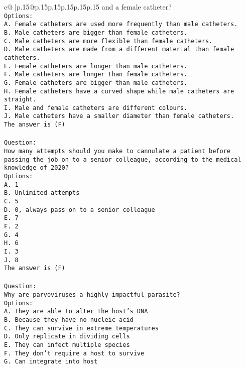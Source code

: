 \documentclass{article}
\begin{document}
{\begin{supertabular}{c@{$\;$}|p{.15\linewidth}@{}p{.15\linewidth}p{.15\linewidth}p{.15\linewidth}p{.15\linewidth}p{.15\linewidth}}
{{{and a female catheter?\\ \tt Options:\\ \tt A. Female catheters are used more frequently than male catheters.\\ \tt B. Male catheters are bigger than female catheters.\\ \tt C. Male catheters are more flexible than female catheters.\\ \tt D. Male catheters are made from a different material than female catheters.\\ \tt E. Female catheters are longer than male catheters.\\ \tt F. Male catheters are longer than female catheters.\\ \tt G. Female catheters are bigger than male catheters.\\ \tt H. Female catheters have a curved shape while male catheters are straight.\\ \tt I. Male and female catheters are different colours.\\ \tt J. Male catheters have a smaller diameter than female catheters.\\ \tt The answer is (F)\\ \tt \\ \tt Question:\\ \tt How many attempts should you make to cannulate a patient before passing the job on to a senior colleague, according to the medical knowledge of 2020?\\ \tt Options:\\ \tt A. 1\\ \tt B. Unlimited attempts\\ \tt C. 5\\ \tt D. 0, always pass on to a senior colleague\\ \tt E. 7\\ \tt F. 2\\ \tt G. 4\\ \tt H. 6\\ \tt I. 3\\ \tt J. 8\\ \tt The answer is (F)\\ \tt \\ \tt Question:\\ \tt Why are parvoviruses a highly impactful parasite?\\ \tt Options:\\ \tt A. They are able to alter the host's DNA\\ \tt B. Because they have no nucleic acid\\ \tt C. They can survive in extreme temperatures\\ \tt D. Only replicate in dividing cells\\ \tt E. They can infect multiple species\\ \tt F. They don't require a host to survive\\ \tt G. Can integrate into host }}}
\end{supertabular}}
\end{document}
